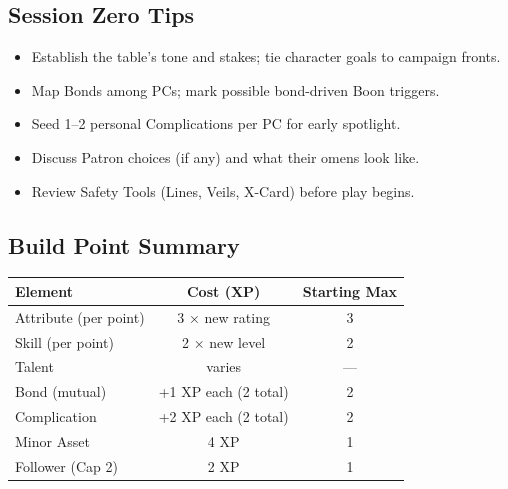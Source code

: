 \subsection{Session Zero Tips}

\begin{itemize}
  \item Establish the table's tone and stakes; tie character goals to campaign fronts.
  \item Map Bonds among PCs; mark possible bond-driven Boon triggers.
  \item Seed 1–2 personal Complications per PC for early spotlight.
  \item Discuss Patron choices (if any) and what their omens look like.
  \item Review Safety Tools (Lines, Veils, X-Card) before play begins.
\end{itemize}

\subsection{Build Point Summary}

\begin{tabular}{@{}lcc@{}}
\toprule
\textbf{Element} & \textbf{Cost (XP)} & \textbf{Starting Max} \\
\midrule
Attribute (per point) & 3 × new rating & 3 \\
Skill (per point) & 2 × new level & 2 \\
Talent & varies & — \\
Bond (mutual) & +1 XP each (2 total) & 2 \\
Complication & +2 XP each (2 total) & 2 \\
Minor Asset & 4 XP & 1 \\
Follower (Cap 2) & 2 XP & 1 \\
\bottomrule
\end{tabular}

